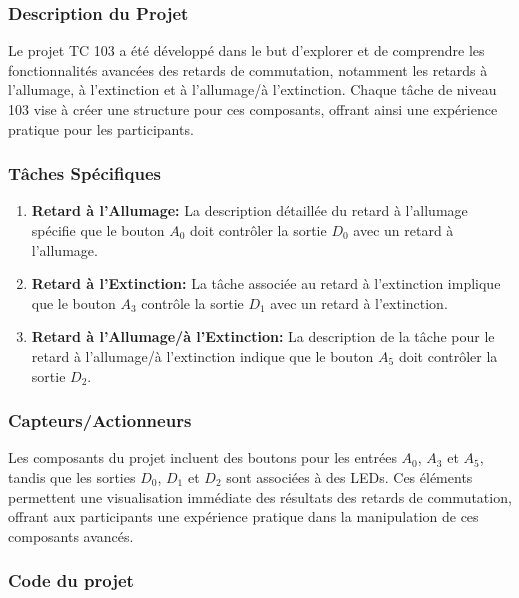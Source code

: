 \documentclass[a4paper,12pt]{report}
\begin{document}
\subsubsection{Description du Projet}

Le projet TC 103 a été développé dans le but d'explorer et de comprendre les fonctionnalités avancées des retards de commutation, notamment les retards à l'allumage, à l'extinction et à l'allumage/à l'extinction. Chaque tâche de niveau 103 vise à créer une structure pour ces composants, offrant ainsi une expérience pratique pour les participants.

\subsubsection{Tâches Spécifiques}

\begin{enumerate}
    \item \textbf{Retard à l'Allumage:} La description détaillée du retard à l'allumage spécifie que le bouton \(A_0\) doit contrôler la sortie \(D_0\) avec un retard à l'allumage.
    
    \item \textbf{Retard à l'Extinction:} La tâche associée au retard à l'extinction implique que le bouton \(A_3\) contrôle la sortie \(D_1\) avec un retard à l'extinction.
    
    \item \textbf{Retard à l'Allumage/à l'Extinction:} La description de la tâche pour le retard à l'allumage/à l'extinction indique que le bouton \(A_5\) doit contrôler la sortie \(D_2\).
\end{enumerate}

\subsubsection{Capteurs/Actionneurs}

Les composants du projet incluent des boutons pour les entrées \(A_0\), \(A_3\) et \(A_5\), tandis que les sorties \(D_0\), \(D_1\) et \(D_2\) sont associées à des LEDs. Ces éléments permettent une visualisation immédiate des résultats des retards de commutation, offrant aux participants une expérience pratique dans la manipulation de ces composants avancés.

\subsubsection{Code du projet}
\end{document}
